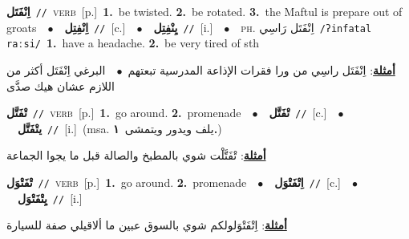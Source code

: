 \documentclass[10pt,a4paper,twoside]{article} %
\begin{document}
\begin{multicols}{2}
{\setlength\topsep{0pt}\textbf{\foreignlanguage{arabic}{اِنْفَتَل}}\ {\color{gray}\texttt{//}\color{black}}\ \textsc{verb}\ [p.]\ \textbf{1.}~be twisted.  \textbf{2.}~be rotated.  \textbf{3.}~the Maftul is prepare out of groats\ \ $\bullet$\ \ \setlength\topsep{0pt}\textbf{\foreignlanguage{arabic}{اِنْفِتِل}}\ {\color{gray}\texttt{//}\color{black}}\ [c.]\ \ $\bullet$\ \ \setlength\topsep{0pt}\textbf{\foreignlanguage{arabic}{يِنْفِتِل}}\ {\color{gray}\texttt{//}\color{black}}\ [i.]\ \ $\bullet$\ \ \textsc{ph.} \color{gray} \foreignlanguage{arabic}{اِنْفَتَل رَاسِي}\color{black}\ {\color{gray}\texttt{/{\sffamily ʔinfatal raːsi}/}\color{black}}\ \textbf{1.}~have a headache.  \textbf{2.}~be very tired of sth\  \begin{flushright}\color{gray}\foreignlanguage{arabic}{\textbf{\underline{\foreignlanguage{arabic}{أمثلة}}}: اِنْفَتَل راسِي من ورا فقرات الإذاعة المدرسية تبعتهم\ $\bullet$\ \  البرغي اِنْفَتَل أكثر من اللازم عشان هيك صدَّى}\end{flushright}\color{black}} \vspace{2mm}

{\setlength\topsep{0pt}\textbf{\foreignlanguage{arabic}{تْفَتَّل}}\ {\color{gray}\texttt{//}\color{black}}\ \textsc{verb}\ [p.]\ \textbf{1.}~go around.  \textbf{2.}~promenade\ \ $\bullet$\ \ \setlength\topsep{0pt}\textbf{\foreignlanguage{arabic}{تْفَتَّل}}\ {\color{gray}\texttt{//}\color{black}}\ [c.]\ \ $\bullet$\ \ \setlength\topsep{0pt}\textbf{\foreignlanguage{arabic}{يتْفَتَّل}}\ {\color{gray}\texttt{//}\color{black}}\ [i.]\ \color{gray}(msa. \foreignlanguage{arabic}{يلف ويدور ويتمشى}~\foreignlanguage{arabic}{\textbf{١.}})\color{black}\  \begin{flushright}\color{gray}\foreignlanguage{arabic}{\textbf{\underline{\foreignlanguage{arabic}{أمثلة}}}: تْفَتَّلْت شوي بالمطبخ والصالة قبل ما يجوا الجماعة}\end{flushright}\color{black}} \vspace{2mm}

{\setlength\topsep{0pt}\textbf{\foreignlanguage{arabic}{تْفَتْوَل}}\ {\color{gray}\texttt{//}\color{black}}\ \textsc{verb}\ [p.]\ \textbf{1.}~go around.  \textbf{2.}~promenade\ \ $\bullet$\ \ \setlength\topsep{0pt}\textbf{\foreignlanguage{arabic}{اِتْفَتْوَل}}\ {\color{gray}\texttt{//}\color{black}}\ [c.]\ \ $\bullet$\ \ \setlength\topsep{0pt}\textbf{\foreignlanguage{arabic}{يِتْفَتْوَل}}\ {\color{gray}\texttt{//}\color{black}}\ [i.]\  \begin{flushright}\color{gray}\foreignlanguage{arabic}{\textbf{\underline{\foreignlanguage{arabic}{أمثلة}}}: اِتْفَتْوَلولكم شوي بالسوق عبين ما ألاقيلي صفة للسيارة}\end{flushright}\color{black}} \vspace{2mm}


\end{multicols}
\end{document}
